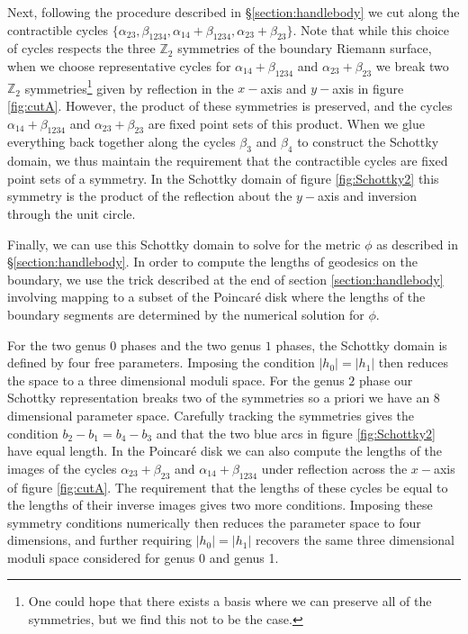 \documentclass[letterpaper,12pt]{article}
\begin{document}
Next, following the procedure described in \S\ref{section:handlebody} we cut along the contractible cycles $\{\alpha_{23}, \beta_{1234}, \alpha_{14}+\beta_{1234}, \alpha_{23}+\beta_{23}\}$. Note that while this choice of cycles respects the three $\mathbb Z_2$ symmetries of the boundary Riemann surface, when we choose representative cycles for $\alpha_{14}+\beta_{1234}$ and $\alpha_{23}+\beta_{23}$ we break two $\mathbb Z_2$ symmetries\footnote{One could hope that there exists a basis where we can preserve all of the symmetries, but we find this not to be the case.}  given by reflection in the $x-$axis and $y-$axis in figure \ref{fig:cutA}. However, the product of these symmetries is preserved, and the cycles $\alpha_{14}+\beta_{1234}$ and $\alpha_{23}+\beta_{23}$ are fixed point sets of this product. When we glue everything back together along the cycles $\beta_3$ and $\beta_4$ to construct the Schottky domain, we thus maintain the requirement that the contractible cycles are fixed point sets of a symmetry. In the Schottky domain of figure \ref{fig:Schottky2} this symmetry is the product of the reflection about the $y-$axis and inversion through the unit circle.

Finally, we can use this Schottky domain to solve for the metric $\phi$ as described in \S\ref{section:handlebody}. In order to compute the lengths of geodesics on the boundary, we use the trick described at the end of section \ref{section:handlebody} involving mapping to a subset of the Poincar\'e disk where the lengths of the boundary segments are determined by the numerical solution for $\phi$.

For the two genus $0$ phases and the two genus $1$ phases, the Schottky domain is defined by four free parameters. Imposing the condition $|h_0| = |h_1|$ then reduces the space to a three dimensional moduli space. For the genus $2$ phase our Schottky representation breaks two of the symmetries so a priori we have an $8$ dimensional parameter space.
Carefully tracking the symmetries gives the condition $b_2-b_1=b_4-b_3$ and that the two blue arcs in figure \ref{fig:Schottky2} have equal length.
In the Poincar\'e disk we can also compute the lengths of the images of the cycles $\alpha_{23}+\beta_{23}$ and $\alpha_{14}+\beta_{1234}$ under reflection across the $x-$axis of figure \ref{fig:cutA}. The requirement that the lengths of these cycles be equal to the lengths of their inverse images gives two more conditions. Imposing these symmetry conditions numerically then reduces the parameter space to four dimensions, and further requiring $|h_0|=|h_1|$ recovers the same three dimensional moduli space considered for genus 0 and genus 1.
\end{document}
